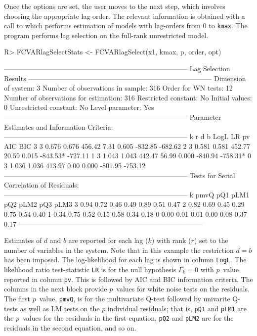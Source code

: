 \documentclass[article]{jss}
\newcommand{\fct}[1]{\code{#1()}}
\begin{document}
Once the options are set, the user moves to the next step, which involves choosing the appropriate lag order. The relevant information is obtained with a call to \fct{FCVARlagSelect}
which performs estimation of models with lag-orders from $0$ to \verb|kmax|. The program performs lag selection on the full-rank unrestricted model. 


\begin{CodeChunk} 
\begin{CodeInput}
R> FCVARlagSelectStats <- FCVARlagSelect(x1, kmax, p, order, opt)
\end{CodeInput}
\begin{CodeOutput}
--------------------------------------------------------------------------------
                        Lag Selection Results 
--------------------------------------------------------------------------------
Dimension of system:       3     Number of observations in sample:          316 
Order for WN tests:       12     Number of observations for estimation:     316 
Restricted constant:      No     Initial values:                              0
Unrestricted constant:    No     Level parameter:                           Yes
--------------------------------------------------------------------------------
Parameter Estimates and Information Criteria:
--------------------------------------------------------------------------------
 k  r    d    b      LogL     LR    pv    AIC       BIC
 3  3 0.676 0.676  456.42   7.31 0.605  -832.85   -682.62 
 2  3 0.581 0.581  452.77  20.59 0.015  -843.53*  -727.11 
 1  3 1.043 1.043  442.47  56.99 0.000  -840.94   -758.31*
 0  3 1.036 1.036  413.97   0.00 0.000  -801.95   -753.12 
--------------------------------------------------------------------------------
Tests for Serial Correlation of Residuals: 
--------------------------------------------------------------------------------
 k   pmvQ  pQ1   pLM1  pQ2   pLM2  pQ3   pLM3
 3   0.94  0.72  0.46  0.49  0.89  0.51  0.47
 2   0.82  0.69  0.45  0.29  0.75  0.54  0.40
 1   0.34  0.75  0.52  0.15  0.58  0.34  0.18
 0   0.00  0.01  0.01  0.00  0.08  0.37  0.17
--------------------------------------------------------------------------------
\end{CodeOutput}
\end{CodeChunk} 

Estimates of $d$ and $b$ are reported for each lag ($k$) with rank ($r$) set to the number of variables in the system. Note that in this example the restriction $d=b$ has been imposed. The log-likelihood for each lag is shown in column \verb|LogL|. The likelihood ratio test-statistic \verb|LR| is for the null hypothesis $\Gamma_k = 0$ with $p$~value reported in column \verb|pv|. This is followed by AIC and BIC information criteria. The columns in the next block provide $p$~values for white noise tests on the residuals. The first $p$~value, \verb|pmvQ|, is for the multivariate Q-test followed by univarite Q-tests as well as LM tests on the $p$ individual residuals; that is, \verb|pQ1| and \verb|pLM1| are the $p$~values for the residuals in the first equation, \verb|pQ2| and \verb|pLM2| are for the residuals in the second equation, and so on. 
\end{document}
